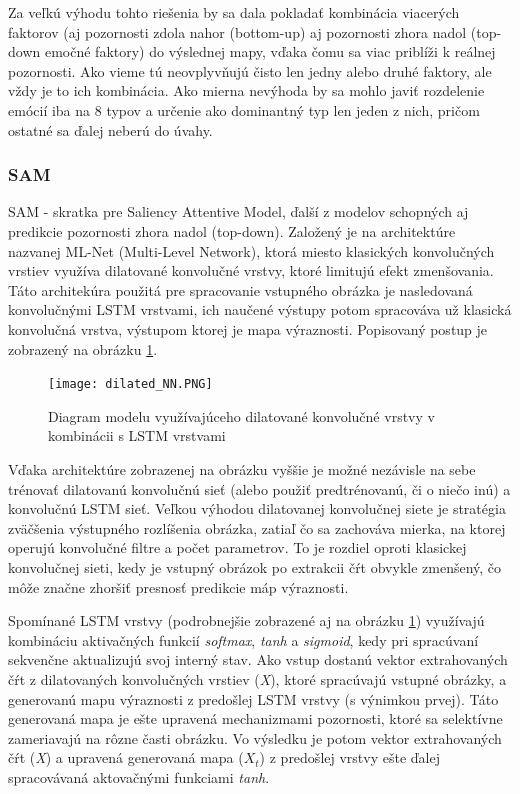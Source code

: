Za veľkú výhodu tohto riešenia by sa dala pokladať kombinácia viacerých faktorov (aj pozornosti zdola nahor (bottom-up) aj pozornosti zhora nadol (top-down emočné faktory)  do výslednej mapy, vďaka čomu sa viac priblíži k reálnej pozornosti. Ako vieme tú neovplyvňujú čisto len jedny alebo druhé faktory, ale vždy je to ich kombinácia. Ako mierna nevýhoda by sa mohlo javiť rozdelenie emócií iba na 8 typov a určenie ako dominantný typ len jeden z nich, pričom ostatné sa ďalej neberú do úvahy.  


\subsubsection{SAM}
\label{sam}
SAM - skratka pre Saliency Attentive Model\cite{cornia2016predicting}, ďalší z modelov schopných aj predikcie pozornosti zhora nadol (top-down). Založený je na architektúre nazvanej ML-Net (Multi-Level Network\cite{cornia2016deep}), ktorá miesto klasických konvolučných vrstiev využíva dilatované konvolučné vrstvy, ktoré limitujú efekt zmenšovania. Táto architekúra použitá pre spracovanie vstupného obrázka je nasledovaná konvolučnými LSTM vrstvami, ich naučené výstupy potom spracováva už klasická konvolučná vrstva, výstupom ktorej je mapa výraznosti. Popisovaný postup je zobrazený na obrázku \ref{dilated_model_image}.

\begin{figure}[H]
	\begin{center}
		\texttt{[image: dilated\_NN.PNG]}
		\caption[Diagram konvolučnej LSTM siete]{Diagram modelu využívajúceho dilatované konvolučné vrstvy v kombinácii s LSTM vrstvami \cite{cornia2016predicting}\label{dilated_model_image}}
	\end{center}
\end{figure}

Vďaka architektúre zobrazenej na obrázku vyššie je možné nezávisle na sebe trénovať dilatovanú konvolučnú sieť (alebo použiť predtrénovanú, či o niečo inú) a konvolučnú LSTM sieť. Veľkou výhodou dilatovanej konvolučnej siete je stratégia zväčšenia výstupného rozlíšenia obrázka, zatiaľ čo sa zachováva mierka, na ktorej operujú konvolučné filtre a počet parametrov. To je rozdiel oproti klasickej konvolučnej sieti, kedy je vstupný obrázok po extrakcii čŕt obvykle zmenšený, čo môže značne zhoršiť presnosť predikcie máp výraznosti.

Spomínané LSTM vrstvy (podrobnejšie zobrazené aj na obrázku \ref{dilated_model_image}) využívajú kombináciu aktivačných funkcií \textit{softmax}, \textit{tanh} a \textit{sigmoid}, kedy pri spracúvaní sekvenčne aktualizujú svoj interný stav. Ako vstup dostanú vektor extrahovaných čŕt z dilatovaných konvolučných vrstiev (\textit{X}), ktoré spracúvajú vstupné obrázky, a generovanú mapu výraznosti z predošlej LSTM vrstvy (s výnimkou prvej). Táto generovaná mapa je ešte upravená mechanizmami pozornosti, ktoré sa selektívne zameriavajú na rôzne časti obrázku. Vo výsledku je potom vektor extrahovaných čŕt (\textit{X}) a upravená generovaná mapa (\textit{$X_t$}) z predošlej vrstvy ešte ďalej spracovávaná aktovačnými funkciami \textit{tanh}.

